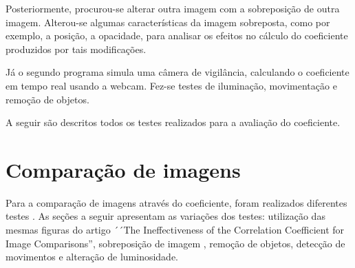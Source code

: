 \documentclass[10pt,a4paper]{article}
\begin{document}
Posteriormente, procurou-se alterar outra imagem com a
sobreposição de outra imagem. Alterou-se algumas características da
imagem sobreposta, como por exemplo, a posição, a opacidade, para
analisar os efeitos no cálculo do coeficiente produzidos por tais modificações. 

Já o segundo programa simula uma câmera de vigilância, calculando o
coeficiente em tempo real usando a webcam. Fez-se testes de
iluminação, movimentação e remoção de objetos.

A seguir são descritos todos os testes realizados para a avaliação do coeficiente.

\newpage
\section{Comparação de imagens}

Para a comparação de imagens através do coeficiente, foram realizados diferentes testes
. As seções a seguir apresentam as variações dos testes: utilização
das mesmas figuras do artigo ´´The Ineffectiveness of the Correlation
Coefficient for Image Comparisons'', sobreposição de imagem , remoção de objetos, detecção
de movimentos e alteração de luminosidade.  
\end{document}
